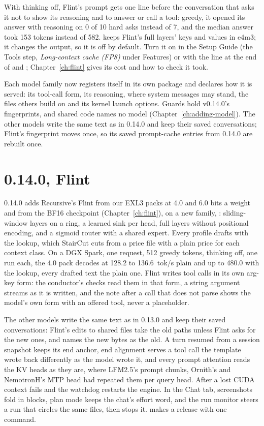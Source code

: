 With thinking off, Flint's prompt gets one line before the conversation that asks it not to show its reasoning and to answer or call a tool: greedy, it opened its answer with reasoning on 0 of 10 hard asks instead of 7, and the median answer took 153 tokens instead of 582.  keeps Flint's full layers' keys and values in e4m3; it changes the output, so it is off by default. Turn it on in the Setup Guide (the Tools step, \emph{Long-context cache (FP8)} under Features) or with the line  at the end of  and ; Chapter~\ref{ch:flint} gives its cost and how to check it took.

Each model family now registers itself in its own package and declares how it is served: its tool-call form, its reasoning, where system messages may stand, the files others build on and its kernel launch options. Guards hold v0.14.0's fingerprints, and shared code names no model (Chapter~\ref{ch:adding-model}). The other models write the same text as in 0.14.0 and keep their saved conversations; Flint's fingerprint moves once, so its saved prompt-cache entries from 0.14.0 are rebuilt once.

\section{0.14.0, Flint}\label{sec:changelog-0140}

0.14.0 adds Recursive's Flint from our EXL3 packs at 4.0 and 6.0 bits a weight and from the BF16 checkpoint (Chapter~\ref{ch:flint}), on a new family, : sliding-window layers on a ring, a learned sink per head, full layers without positional encoding, and a sigmoid router with a shared expert. Every profile drafts with the lookup, which StairCut cuts from a price file with a plain price for each context class. On a DGX Spark, one request, 512 greedy tokens, thinking off, one run each, the 4.0 pack decodes at 128.2 to 136.6~tok/s plain and up to 480.0 with the lookup, every drafted text the plain one. Flint writes tool calls in its own arg-key form: the conductor's checks read them in that form, a string argument streams as it is written, and the note after a call that does not parse shows the model's own form with an offered tool, never a placeholder.

The other models write the same text as in 0.13.0 and keep their saved conversations: Flint's edits to shared files take the old paths unless Flint asks for the new ones, and  names the new bytes as the old. A turn resumed from a session snapshot keeps its end anchor, end alignment serves a tool call the template wrote back differently as the model wrote it, and every prompt attention reads the KV heads as they are, where LFM2.5's prompt chunks, Ornith's and NemotronH's MTP head had repeated them per query head. After a lost CUDA context  fails and the watchdog restarts the engine. In the Chat tab, screenshots fold in blocks, plan mode keeps the chat's effort word, and the run monitor steers a run that circles the same files, then stops it.  makes a release with one command.

